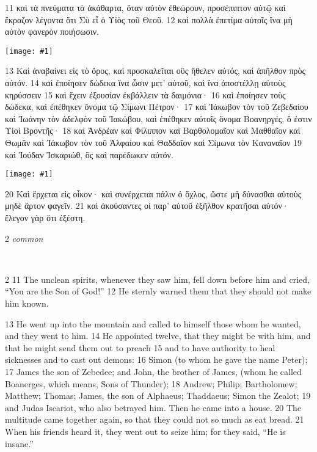 \documentclass[10pt,a5paper,twoside,twocolumn]{book}
\newcommand{\fig}[1]{\texttt{[image: \#1]}\label{fig:#1}}
\newcommand*\cleartoleftpage{%
  \ifodd\value{page}\hbox{}\clearpage\fi
}
\newcommand{\separator}{
  \vspace{-0.5\baselineskip}%
  \hspace{0.27\textwidth}%
  \noindent\makebox[\linewidth]{\resizebox{0.3333\linewidth}{1pt}{$\bullet$}}\bigskip%
  \vspace{-0.5\baselineskip}
}
\newenvironment{facing}{\cleartoleftpage}{\clearpage\pagebreak}
\newenvironment{help}{\clearpage}{}
\newenvironment{helpsec}{\begin{minipage}[t]{\textwidth}\begin{multicols}{2}}{\end{multicols}\end{minipage}}
\newenvironment{vocab}{\begin{helpsec}}{\end{helpsec}}
\newenvironment{translation}{\separator\\\begin{helpsec}\footnotesize}{\end{helpsec}}
\begin{document}
\begin{facing}

11 καὶ τὰ πνεύματα τὰ ἀκάθαρτα, ὅταν αὐτὸν ἐθεώρουν, προσέπιπτον αὐτῷ καὶ ἔκραζον λέγοντα ὅτι Σὺ εἶ ὁ Υἱὸς τοῦ Θεοῦ. 12 καὶ πολλὰ ἐπετίμα αὐτοῖς ἵνα μὴ αὐτὸν φανερὸν ποιήσωσιν. 

\fig{03-13} %

13 Καὶ ἀναβαίνει εἰς τὸ ὄρος, καὶ προσκαλεῖται οὓς ἤθελεν αὐτός, καὶ ἀπῆλθον πρὸς αὐτόν. 14 καὶ ἐποίησεν δώδεκα ἵνα ὦσιν μετ’ αὐτοῦ, καὶ ἵνα ἀποστέλλῃ αὐτοὺς κηρύσσειν 15 καὶ ἔχειν ἐξουσίαν ἐκβάλλειν τὰ δαιμόνια· 16 καὶ ἐποίησεν τοὺς δώδεκα, καὶ ἐπέθηκεν ὄνομα τῷ Σίμωνι Πέτρον· 17 καὶ Ἰάκωβον τὸν τοῦ Ζεβεδαίου καὶ Ἰωάνην τὸν ἀδελφὸν τοῦ Ἰακώβου, καὶ ἐπέθηκεν αὐτοῖς ὄνομα Βοανηργές, ὅ ἐστιν Υἱοὶ Βροντῆς· 18 καὶ Ἀνδρέαν καὶ Φίλιππον καὶ Βαρθολομαῖον καὶ Μαθθαῖον καὶ Θωμᾶν καὶ Ἰάκωβον τὸν τοῦ Ἁλφαίου καὶ Θαδδαῖον καὶ Σίμωνα τὸν Καναναῖον 19 καὶ Ἰούδαν Ἰσκαριώθ, ὃς καὶ παρέδωκεν αὐτόν.

\fig{03-20} %

	20 Καὶ ἔρχεται εἰς οἶκον· καὶ συνέρχεται πάλιν ὁ ὄχλος, ὥστε μὴ δύνασθαι αὐτοὺς μηδὲ ἄρτον φαγεῖν. 21 καὶ ἀκούσαντες οἱ παρ’ αὐτοῦ ἐξῆλθον κρατῆσαι αὐτόν· ἔλεγον γὰρ ὅτι ἐξέστη. 

\begin{help}
\begin{vocab}
\emph{common}\\

\end{vocab}
\begin{translation}
 11 The unclean spirits, whenever they saw him, fell down before him and cried, ``You are the Son of God!'' 12 He sternly warned them that they should not make him known.

13 He went up into the mountain and called to himself those whom he wanted, and they went to him. 14 He appointed twelve, that they might be with him, and that he might send them out to preach 15 and to have authority to heal sicknesses and to cast out demons: 16 Simon (to whom he gave the name Peter); 17 James the son of Zebedee; and John, the brother of James, (whom he called Boanerges, which means, Sons of Thunder); 18 Andrew; Philip; Bartholomew; Matthew; Thomas; James, the son of Alphaeus; Thaddaeus; Simon the Zealot; 19 and Judas Iscariot, who also betrayed him.
Then he came into a house. 20 The multitude came together again, so that they could not so much as eat bread. 21 When his friends heard it, they went out to seize him; for they said, ``He is insane.''

\end{translation}
\end{help}
\end{facing}
\end{document}
